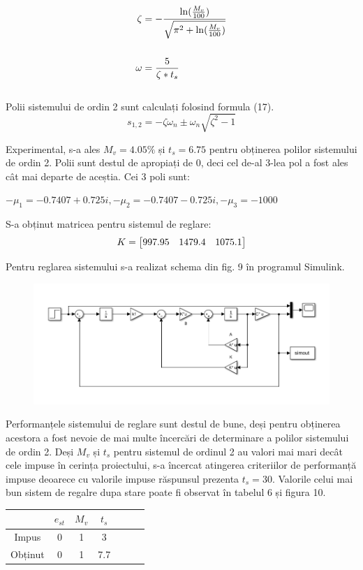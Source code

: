 \documentclass[11pt]{article}
\begin{document}
\begin{align}
\zeta&=-\frac{\ln(\frac{M_v}{100})}{\sqrt{\pi^2+\ln(\frac{M_v}{100})}}\\
\notag\\
\omega&=\frac{5}{\zeta\ast t_s}
\end{align}
\\
Polii sistemului de ordin 2 sunt calculați folosind formula (17).
\begin{equation}
s_{1,2}=-\zeta\omega_{n}\pm\omega_{n}\sqrt{\zeta^2-1}
\end{equation}

Experimental, s-a ales $M_v=4.05\%$ și $t_s=6.75$ pentru obținerea polilor sistemului de ordin 2. Polii sunt destul de apropiați de 0, deci cel de-al 3-lea pol a fost ales cât mai departe de aceștia. Cei 3 poli sunt:
\begin{center}
	$-\mu_1=-0.7407+0.725i,-\mu_2=-0.7407-0.725i,-\mu_3=-1000$
\end{center}
S-a obținut matricea pentru sistemul de reglare:
\begin{align}
K=
\begin{bmatrix}
997.95& 1479.4&1075.1 \notag
\end{bmatrix}
\end{align}

Pentru reglarea sistemului s-a realizat schema din fig. 9 în programul Simulink.
\begin{figure}[H]
	\centering
	\includegraphics[width=1\linewidth]{stare.png}
	\label{fig:test2}
\end{figure}

Performanțele sistemului de reglare sunt destul de bune, deși pentru obținerea acestora a fost nevoie de mai multe încercări de determinare a polilor sistemului de ordin 2. Deși $M_v$ și $t_s$ 
pentru sistemul de ordinul 2 au valori mai mari decât cele impuse în cerința proiectului, s-a încercat atingerea criteriilor de performanță impuse deoarece cu valorile impuse răspunsul prezenta $t_s=30$. Valorile celui mai bun sistem de regalre dupa stare poate fi observat  în tabelul 6 și figura 10.
\begin{center}
	\begin{tabular}{|c|c|c|c|c|c|c|}
		\hline
		&$e_{st}$&$M_v$&$t_s$\\
		\hline
		Impus&0&1&3\\
		\hline
		Obținut&0&1&7.7\\
		\hline
	\end{tabular}
\end{center}
\end{document}

